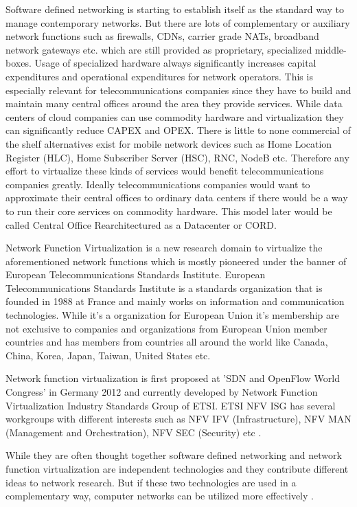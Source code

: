 \documentclass[12pt,oneandhalf,chaparabic,ceng,ms,eng,oneside,pntc]{gsufbe}
\begin{document}
Software defined networking is starting to establish itself as the standard way to manage contemporary
networks.  But there are lots of complementary or auxiliary network functions such as firewalls, CDNs,
carrier grade NATs, broadband network gateways etc.  which are still provided as proprietary,
specialized middle-boxes.  Usage of specialized hardware always significantly increases capital
expenditures and operational expenditures for network operators.  This is especially relevant for
telecommunications companies since they have to build and maintain many central offices around
the area they provide services.  While data centers of cloud companies can use commodity hardware and
virtualization they can significantly reduce CAPEX and OPEX.  There is little to none commercial of the
shelf alternatives exist for mobile network devices such as Home Location Register (HLC), Home
Subscriber Server (HSC), RNC, NodeB etc.  \cite{khalid_standardized_2016} Therefore any effort to 
virtualize these kinds of services
would benefit telecommunications companies greatly.  Ideally telecommunications
companies would want to
approximate their central offices to ordinary data centers if there would be a way to run their core
services on commodity hardware.  This model later would be called Central Office Rearchitectured as a
Datacenter or CORD.

Network Function Virtualization is a new research domain to virtualize the aforementioned network
functions which is mostly pioneered under the banner of European Telecommunications Standards
Institute.  European Telecommunications Standards Institute \cite{etsi} is a standards organization
that is
founded in 1988 at France and mainly works on information and communication technologies.  While it's a
organization for European Union it's membership are not exclusive to companies and organizations from
European Union member countries and has members from countries all around the world like Canada, China,
Korea, Japan, Taiwan, United States etc.

Network function virtualization is first proposed at 'SDN and OpenFlow World Congress' in
Germany 2012 and currently developed by Network Function Virtualization Industry Standards Group of
ETSI.  ETSI NFV ISG has several workgroups with different interests such as NFV IFV (Infrastructure),
NFV MAN (Management and Orchestration), NFV SEC (Security) etc \cite{ntt_nfv}.

While they are often thought together software defined networking and network function virtualization
are independent technologies and they contribute different ideas to network research.  But if these two
technologies are used in a complementary way, computer networks can be utilized more effectively
\cite{gray_network_2016}.
\end{document}
